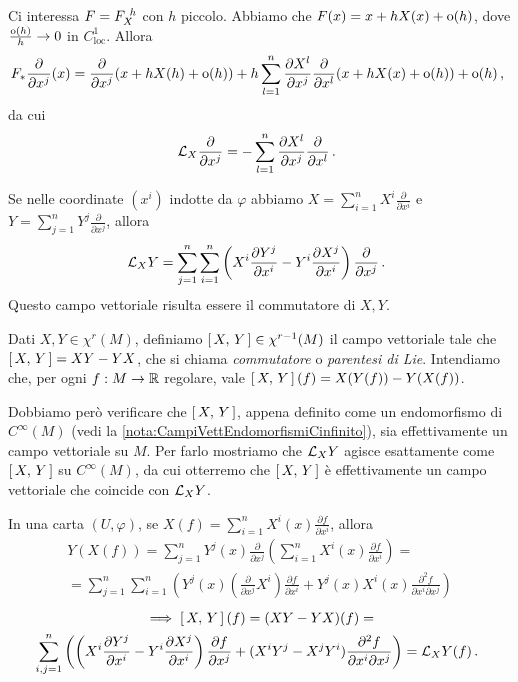 Ci interessa $F=F_{X}^{\ h}$ con $h$ piccolo. Abbiamo che $F(x)=x+hX(x)+\mathrm{o}(h)$, dove $\frac{\mathrm{o}(h)}{h}\to 0$ in $C^1_{\text{loc}}$.
Allora
\begin{equation*}
	F_*\frac\partial{\partial x^j}(x)=\frac{\partial }{\partial x^j}(x+hX(h)+\mathrm{o}(h))+h\sum_{l=1}^n \frac{\partial X^l}{\partial x^j}\frac\partial{\partial x^l}(x+hX(x)+\mathrm{o}(h))+\mathrm{o}(h)\, \text{, }
\end{equation*}
da cui
\begin{equation*}
	\mathcal L_X\frac\partial{\partial x^j}=-\sum_{l=1}^n \frac{\partial X^l}{\partial x^j}\frac\partial{\partial x^l}\, \text{. }
\end{equation*}

Se nelle coordinate $(x^i)$ indotte da $\varphi$ abbiamo $X=\sum_{i=1}^n X^i\frac\partial{\partial x^i}$ e $Y=\sum_{j=1}^n Y^j\frac\partial{\partial x^j}$, allora
\begin{equation*}
	\mathcal L_XY=\sum_{j=1}^n\sum_{i=1}^n \left(X^i\frac{\partial Y^j}{\partial x^i}-Y^i\frac{\partial X^j}{\partial x^i}\right)\frac\partial{\partial x^j} \, \text{. }
\end{equation*}
Questo campo vettoriale risulta essere il commutatore di $X,Y$.

\begin{definition}  
Dati $X,Y\in\chi^r(M)$, definiamo $\left[\,X,\,Y\,\right]\in\chi^{r-1}(M)$ il campo vettoriale tale che $\left[\,X,\,Y\,\right]=XY-YX$, che si chiama \emph{commutatore} o \emph{parentesi di Lie}.
Intendiamo che, per ogni $f:M\to\mathbb R$ regolare, vale $\left[\,X,\,Y\,\right](f)=X(Y(f))-Y(X(f))$.
\end{definition}

Dobbiamo però verificare che $\left[\,X,\,Y\,\right]$, appena definito come un endomorfismo di $C^\infty(M)$ (vedi la \cref{nota:CampiVettEndomorfismiCinfinito}), sia effettivamente un campo vettoriale su $M$.  Per farlo mostriamo che $\mathcal L_XY$ agisce esattamente come $\left[\,X,\,Y\,\right]$ su $C^\infty(M)$, da cui otterremo che $\left[\,X,\,Y\,\right]$ è effettivamente un campo vettoriale che coincide con $\mathcal L_XY$.

In una carta $(U,\varphi)$, se $X(f)=\sum_{i=1}^n X^i(x)\frac{\partial f}{\partial x^i}$, allora
\begin{multline*}
	Y(X(f))=\sum_{j=1}^nY^j(x)\frac\partial{\partial x^j}\left( \sum_{i=1}^n X^i(x)\frac{\partial f}{\partial x^i} \right)=\\
	= \sum_{j=1}^n \sum_{i=1}^n \left( Y^j(x) \left(\frac{\partial}{\partial x^j}X^i\right)\frac{\partial f}{\partial x^i} +Y^j(x)X^i(x)\frac{\partial^2 f}{\partial x^i\partial x^j} \right)
\end{multline*}
\begin{multline*}
	\implies \left[\,X,\,Y\,\right](f) = (XY-YX)(f)=\\
	\sum_{i,j=1}^n\left( \left(X^i\frac{\partial Y^j}{\partial x^i}-Y^i\frac{\partial X^j}{\partial x^i}\right)\frac{\partial f}{\partial x^j} +(X^iY^j-X^jY^i)\frac{\partial^2 f}{\partial x^i\partial x^j}  \right)=\mathcal L_XY(f) \, \text{. }
\end{multline*}

